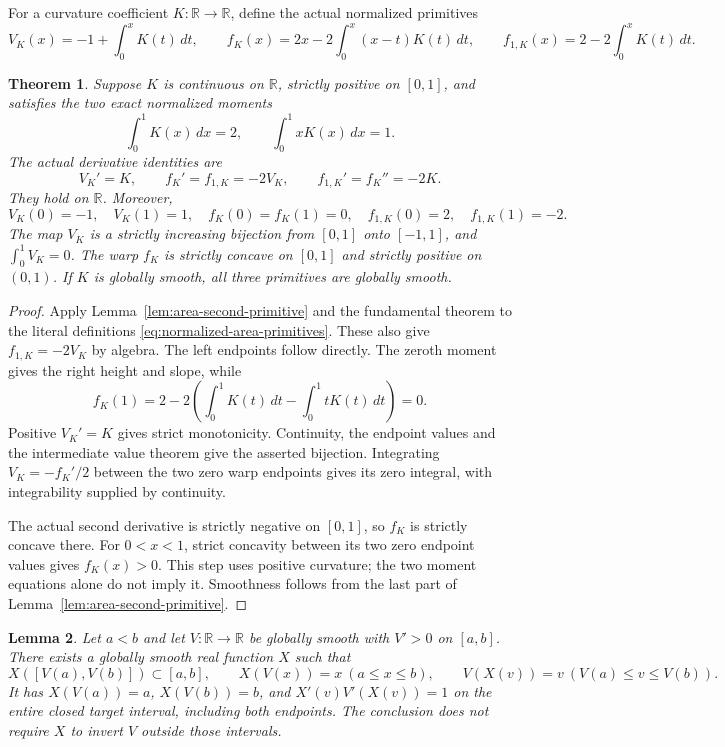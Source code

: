 \documentclass[11pt]{article}
\newtheorem{theorem}{Theorem}[section]
\newtheorem{lemma}[theorem]{Lemma}
\newcommand{\R}{\mathbb R}
\begin{document}
For a curvature coefficient $K:\R\to\R$, define the actual normalized primitives
\begin{equation}\label{eq:normalized-area-primitives}
 V_K(x)=-1+\int_0^xK(t)\,dt,\qquad
 f_K(x)=2x-2\int_0^x(x-t)K(t)\,dt,\qquad
 f_{1,K}(x)=2-2\int_0^xK(t)\,dt .
\end{equation}

\begin{theorem}\label{thm:positive-normalized-area-geometry}
Suppose $K$ is continuous on $\R$, strictly positive on $[0,1]$, and satisfies
the two exact normalized moments
\[
 \int_0^1K(x)\,dx=2,\qquad \int_0^1xK(x)\,dx=1.
\]
The actual derivative identities are
\[
 V_K'=K,\qquad f_K'=f_{1,K}=-2V_K,\qquad
 f_{1,K}'=f_K''=-2K .
\]
They hold on $\R$. Moreover,
\[
 V_K(0)=-1,\quad V_K(1)=1,\quad
 f_K(0)=f_K(1)=0,\quad f_{1,K}(0)=2,\quad f_{1,K}(1)=-2.
\]
The map $V_K$ is a strictly increasing bijection from $[0,1]$ onto $[-1,1]$,
and $\int_0^1V_K=0$. The warp $f_K$ is strictly concave on $[0,1]$ and
strictly positive on $(0,1)$. If $K$ is globally smooth, all three primitives
are globally smooth.
\end{theorem}

\begin{proof}
Apply Lemma~\ref{lem:area-second-primitive} and the fundamental theorem to
the literal definitions \eqref{eq:normalized-area-primitives}. These also
give $f_{1,K}=-2V_K$ by algebra. The left endpoints follow directly.
The zeroth moment gives the right height and slope, while
\[
 f_K(1)=2-2\left(\int_0^1K(t)\,dt-\int_0^1tK(t)\,dt\right)=0 .
\]
Positive $V_K'=K$ gives strict monotonicity. Continuity, the endpoint values
and the intermediate value theorem give the asserted bijection.
Integrating $V_K=-f_K'/2$ between the two zero warp endpoints gives its
zero integral, with integrability supplied by continuity.

The actual second derivative is strictly negative on $[0,1]$, so $f_K$
is strictly concave there. For $0<x<1$, strict concavity between its two
zero endpoint values gives $f_K(x)>0$. This step uses positive curvature;
the two moment equations alone do not imply it.
Smoothness follows from the last part of Lemma~\ref{lem:area-second-primitive}.
\end{proof}

\begin{lemma}\label{lem:smooth-closed-interval-inverse}
Let $a<b$ and let $V:\R\to\R$ be globally smooth with $V'>0$ on $[a,b]$.
There exists a globally smooth real function $X$ such that
\[
 X([V(a),V(b)])\subset[a,b],\qquad
 X(V(x))=x\ (a\leq x\leq b),\qquad
 V(X(v))=v\ (V(a)\leq v\leq V(b)).
\]
It has $X(V(a))=a$, $X(V(b))=b$, and
$X'(v)V'(X(v))=1$ on the entire closed target interval, including both endpoints.
The conclusion does not require $X$ to invert $V$ outside those intervals.
\end{lemma}
\end{document}
